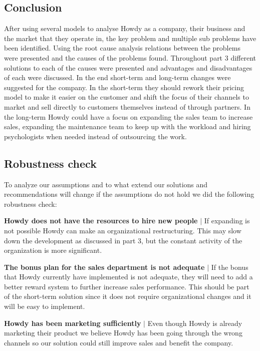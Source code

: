 \subsection{Conclusion}
After using several models to analyse Howdy as a company, their business and the market that they operate in, the key problem and multiple sub problems have been identified. Using the root cause analysis relations between the problems were presented and the causes of the problems found. Throughout part 3 different solutions to each of the causes were presented and advantages and disadvantages of each were discussed. In the end short-term and long-term changes were suggested for the company. In the short-term they should rework their pricing model to make it easier on the customer and shift the focus of their channels to market and sell directly to customers themselves instead of through partners. In the long-term Howdy could have a focus on expanding the sales team to increase sales, expanding the maintenance team to keep up with the workload and hiring psychologists when needed instead of outsourcing the work.

\subsection{Robustness check}

To analyze our assumptions and to what extend our solutions and recommendations will change if the assumptions do not hold we did the following robustness check:

\noindent \textbf{Howdy does not have the resources to hire new people} $|$ If expanding is not possible Howdy can make an organizational restructuring. This may slow down the development as discussed in part 3, but the constant activity of the organization is more significant.

\noindent \textbf{The bonus plan for the sales department is not adequate} $|$ If the bonus that Howdy currently have implemented is not adequate, they will need to add a better reward system to further increase sales performance. This should be part of the short-term solution since it does not require organizational changes and it will be easy to implement.

\noindent \textbf{Howdy has been marketing sufficiently} $|$ Even though Howdy is already marketing their product we believe Howdy has been going through the wrong channels so our solution could still improve sales and benefit the company.

